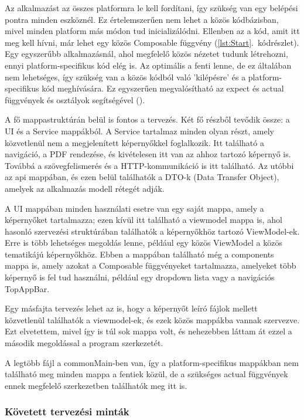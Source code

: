 Az alkalmazást az összes platformra le kell fordítani, így szükség van egy belépési pontra minden eszköznél.  
Ez értelemszerűen nem lehet a közös kódbázisban, mivel minden platform más módon tud inicializálódni.  
Ellenben az a kód, amit itt meg kell hívni, már lehet egy közös Composable függvény (\ref{lst:Start}.~kódrészlet).  
Egy egyszerűbb alkalmazásnál, ahol megfelelő közös nézetet tudunk létrehozni, ennyi platform-specifikus kód elég is.  
Az optimális a fenti lenne, de ez általában nem lehetséges, így szükség van a közös kódból való 'kilépésre' és a platform-specifikus kód meghívására.  
Ez egyszerűen megvalósítható az expect és actual függvények és osztályok segítségével ().

A fő mappastruktúrán belül is fontos a tervezés.  
Két fő részből tevődik össze: a UI és a Service mappákból.  
A Service tartalmaz minden olyan részt, amely közvetlenül nem a megjelenített képernyőkkel foglalkozik.  
Itt található a navigáció, a PDF rendezése, és kivételesen itt van az ahhoz tartozó képernyő is.  
Továbbá a szövegfelismerés és a HTTP-kommunikáció is itt található.  
Az utóbbi az api mappában, és ezen belül találhatók a DTO-k (Data Transfer Object), amelyek az alkalmazás modell rétegét adják.

A UI mappában minden használati esetre van egy saját mappa, amely a képernyőket tartalmazza; ezen kívül itt található a viewmodel mappa is, ahol hasonló szervezési struktúrában találhatók a képernyőkhöz tartozó ViewModel-ek.  
Erre is több lehetséges megoldás lenne, például egy közös ViewModel a közös tematikájú képernyőkhöz.  
Ebben a mappában található még a components mappa is, amely azokat a Composable függvényeket tartalmazza, amelyeket több képernyő is fel tud használni, például egy dropdown lista vagy a navigációs TopAppBar.

Egy másfajta tervezés lehet az is, hogy a képernyőt leíró fájlok mellett közvetlenül találhatók a viewmodel-ek, és ezek közös mappákba vannak szervezve.  
Ezt elvetettem, mivel így is túl sok mappa volt, és nehezebben láttam át ezzel a második megoldással a program szerkezetét.

A legtöbb fájl a commonMain-ben van, így a platform-specifikus mappákban nem található meg minden mappa a fentiek közül, de a szükséges actual függvények ennek megfelelő szerkezetben találhatók meg itt is.

\subsubsection{Követett tervezési minták}


